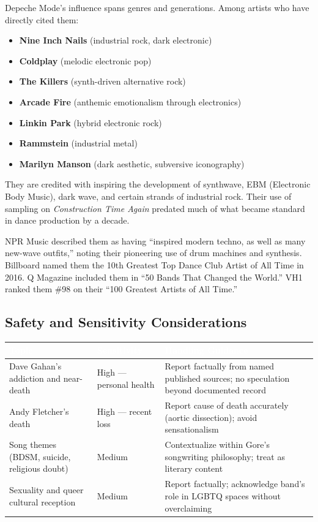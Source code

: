 \documentclass[11pt,letterpaper]{article}
\newcommand{\tableheader}[1]{\textbf{\sffamily\textcolor{white}{#1}}}
\begin{document}
Depeche Mode's influence spans genres and generations. Among artists who have directly cited them:
\begin{itemize}
  \item \textbf{Nine Inch Nails} (industrial rock, dark electronic)
  \item \textbf{Coldplay} (melodic electronic pop)
  \item \textbf{The Killers} (synth-driven alternative rock)
  \item \textbf{Arcade Fire} (anthemic emotionalism through electronics)
  \item \textbf{Linkin Park} (hybrid electronic rock)
  \item \textbf{Rammstein} (industrial metal)
  \item \textbf{Marilyn Manson} (dark aesthetic, subversive iconography)
\end{itemize}

They are credited with inspiring the development of synthwave, EBM (Electronic Body Music), dark wave, and certain strands of industrial rock. Their use of sampling on \textit{Construction Time Again} predated much of what became standard in dance production by a decade.

NPR Music described them as having ``inspired modern techno, as well as many new-wave outfits,'' noting their pioneering use of drum machines and synthesis. Billboard named them the 10th Greatest Top Dance Club Artist of All Time in 2016. Q Magazine included them in ``50 Bands That Changed the World.'' VH1 ranked them \#98 on their ``100 Greatest Artists of All Time.''

\subsection{Safety and Sensitivity Considerations}

\begin{center}
\begin{tabularx}{\textwidth}{L{3.5cm}L{3.5cm}X}
\toprule
{}
\tableheader{Topic} & \tableheader{Sensitivity} & \tableheader{Handling Guidance} \\
\midrule
Dave Gahan's addiction and near-death & High — personal health & Report factually from named published sources; no speculation beyond documented record \\
Andy Fletcher's death & High — recent loss & Report cause of death accurately (aortic dissection); avoid sensationalism \\
Song themes (BDSM, suicide, religious doubt) & Medium & Contextualize within Gore's songwriting philosophy; treat as literary content \\
Sexuality and queer cultural reception & Medium & Report factually; acknowledge band's role in LGBTQ spaces without overclaiming \\
\bottomrule
\end{tabularx}
\end{center}
\end{document}
